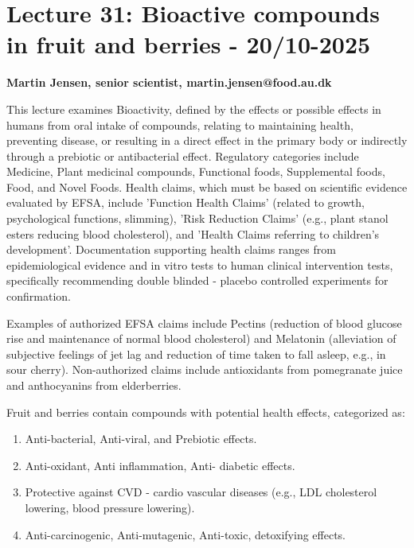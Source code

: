 \section{Lecture 31: Bioactive compounds in fruit and berries - 20/10-2025}
\textbf{Martin Jensen, senior scientist, martin.jensen@food.au.dk}

\vspace{1em}
This lecture examines Bioactivity, defined by the effects or possible effects in humans from oral intake of compounds, relating to maintaining health, preventing disease, or resulting in a direct effect in the primary body or indirectly through a prebiotic or antibacterial effect. Regulatory categories include Medicine, Plant medicinal compounds, Functional foods, Supplemental foods, Food, and Novel Foods. Health claims, which must be based on scientific evidence evaluated by EFSA, include 'Function Health Claims' (related to growth, psychological functions, slimming), 'Risk Reduction Claims' (e.g., plant stanol esters reducing blood cholesterol), and 'Health Claims referring to children's development'. Documentation supporting health claims ranges from epidemiological evidence and in vitro tests to human clinical intervention tests, specifically recommending double blinded - placebo controlled experiments for confirmation.

\vspace{0.5em}
Examples of authorized EFSA claims include Pectins (reduction of blood glucose rise and maintenance of normal blood cholesterol) and Melatonin (alleviation of subjective feelings of jet lag and reduction of time taken to fall asleep, e.g., in sour cherry). Non-authorized claims include antioxidants from pomegranate juice and anthocyanins from elderberries.

\vspace{0.5em}
Fruit and berries contain compounds with potential health effects, categorized as: 

\begin{enumerate} 
    \item Anti-bacterial, Anti-viral, and Prebiotic effects. 
    \item Anti-oxidant, Anti inflammation, Anti- diabetic effects. 
    \item Protective against CVD - cardio vascular diseases (e.g., LDL cholesterol lowering, blood pressure lowering). 
    \item Anti-carcinogenic, Anti-mutagenic, Anti-toxic, detoxifying effects. 
\end{enumerate} 

